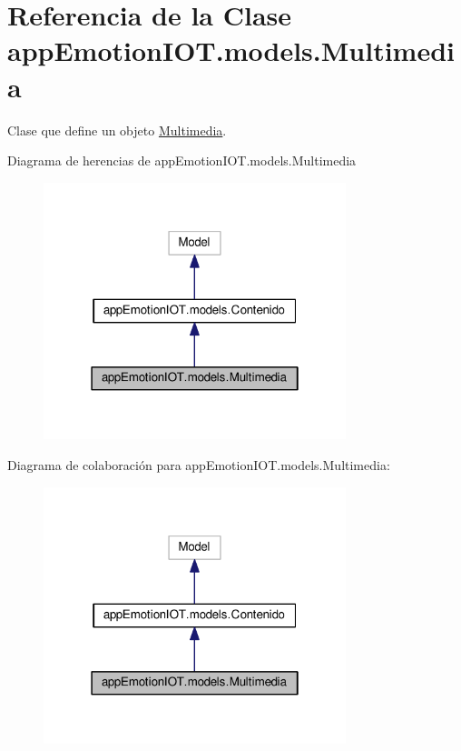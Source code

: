 \hypertarget{classappEmotionIOT_1_1models_1_1Multimedia}{}\section{Referencia de la Clase app\+Emotion\+I\+O\+T.\+models.\+Multimedia}
\label{classappEmotionIOT_1_1models_1_1Multimedia}


Clase que define un objeto \hyperlink{classappEmotionIOT_1_1models_1_1Multimedia}{Multimedia}.  




Diagrama de herencias de app\+Emotion\+I\+O\+T.\+models.\+Multimedia
\nopagebreak
\begin{figure}[H]
\begin{center}
\leavevmode
\includegraphics[width=250pt]{classappEmotionIOT_1_1models_1_1Multimedia__inherit__graph}
\end{center}
\end{figure}


Diagrama de colaboración para app\+Emotion\+I\+O\+T.\+models.\+Multimedia\+:
\nopagebreak
\begin{figure}[H]
\begin{center}
\leavevmode
\includegraphics[width=250pt]{classappEmotionIOT_1_1models_1_1Multimedia__coll__graph}
\end{center}
\end{figure}
